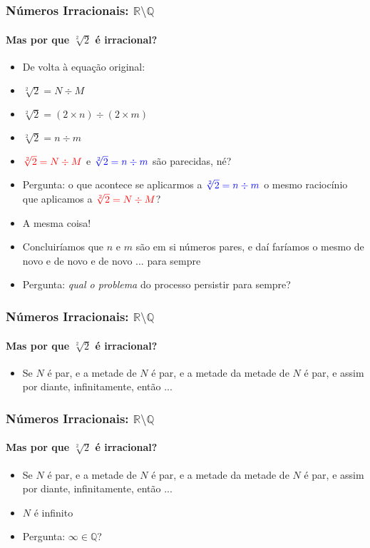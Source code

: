 \documentclass[usenames,dvipsnames,svgnames]{beamer}
\begin{document}
\begin{frame}
	
	\frametitle{Números Irracionais: $\mathbb{R} \setminus \mathbb{Q}$}
	\framesubtitle{Mas {\color{red}por que} $\sqrt[2]{2}$ é irracional?}

	\begin{itemize}
		\item De volta à equação original:
		\item $\sqrt[2]{2} = N \div M$
		\item $\sqrt[2]{2} = (2 \times n) \div (2 \times m)$
		\item $\sqrt[2]{2} = n \div m$
		\item ${\color{red}\sqrt[2]{2} = N \div M}$ e ${\color{blue}\sqrt[2]{2} = n \div m}$ são parecidas, né?
		\item Pergunta: o que acontece se aplicarmos a ${\color{blue}\sqrt[2]{2} = n \div m}$ o mesmo raciocínio que aplicamos a ${\color{red}\sqrt[2]{2} = N \div M}$?
		\item A mesma coisa!
		\item Concluiríamos que $n$ e $m$ são em si números pares, e daí faríamos o mesmo de novo e de novo e de novo ... para sempre
		\item Pergunta: \emph{qual o problema} do processo persistir para sempre?
	\end{itemize}

\end{frame}

\begin{frame}
	
	\frametitle{Números Irracionais: $\mathbb{R} \setminus \mathbb{Q}$}
	\framesubtitle{Mas {\color{red}por que} $\sqrt[2]{2}$ é irracional?}

	\begin{itemize}
		\item Se $N$ é par, e a metade de $N$ é par, e a metade da metade de $N$ é par, e assim por diante, infinitamente, então ...
	\end{itemize}

\end{frame}

\begin{frame}
	
	\frametitle{Números Irracionais: $\mathbb{R} \setminus \mathbb{Q}$}
	\framesubtitle{Mas {\color{red}por que} $\sqrt[2]{2}$ é irracional?}

	\begin{itemize}
		\item Se $N$ é par, e a metade de $N$ é par, e a metade da metade de $N$ é par, e assim por diante, infinitamente, então ...
		\item $N$ é {\color{red} infinito}
		\item Pergunta: $\infty \in \mathbb{Q}$?
	\end{itemize}

\end{frame}
\end{document}
